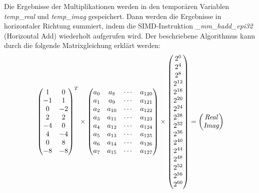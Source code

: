\documentclass[course=erap]{aspdoc}
\begin{document}
    Die Ergebnisse der Multiplikationen werden in den temporären Variablen \textit{temp\_real} und \textit{temp\_imag} gespeichert.
    Dann werden die Ergebnisse in horizontaler Richtung summiert, indem die SIMD-Instruktion \textit{\_mm\_hadd\_epi32} (Horizontal Add) wiederholt aufgerufen wird.
    \newpage
    Der beschriebene Algorithmus kann durch die folgende Matrixgleichung erklärt werden:
    \[
        \newline
        \begin{pmatrix}
            1  & 0  \\
            -1 & 1  \\
            0  & -2 \\
            2  & 2  \\
            -4 & 0  \\
            4  & -4 \\
            0  & 8  \\
            -8 & -8
        \end{pmatrix}
        ^{T}
        \times
        \begin{pmatrix}
            a_0 & a_8    & \cdots & a_{120} \\
            a_1 & a_9    & \cdots & a_{121} \\
            a_2 & a_{10} & \cdots & a_{122} \\
            a_3 & a_{11} & \cdots & a_{123} \\
            a_4 & a_{12} & \cdots & a_{124} \\
            a_5 & a_{13} & \cdots & a_{125} \\
            a_6 & a_{14} & \cdots & a_{126} \\
            a_7 & a_{15} & \cdots & a_{127}
        \end{pmatrix}
        \times
        \begin{pmatrix}
            2^0    \\
            2^4    \\
            2^8    \\
            2^{12} \\
            2^{16} \\
            2^{20} \\
            2^{24} \\
            2^{28} \\
            2^{32} \\
            2^{36} \\
            2^{40} \\
            2^{44} \\
            2^{48} \\
            2^{52} \\
            2^{56} \\
            2^{60}
        \end{pmatrix}
        =
        \begin{pmatrix}
            \textit{Real} \\
            \textit{Imag}
        \end{pmatrix}
    \]
    \newline
\end{document}
